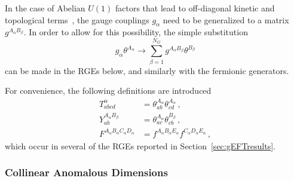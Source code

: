 In the case of Abelian $U(1)$ factors that lead to off-diagonal kinetic and topological terms~\cite{Holdom:1985ag,delAguila:1988jz}, the gauge couplings $g_{\alpha}$ need to be generalized to a matrix $g^{A_\alpha B_\beta}$. In order to allow for this possibility, the simple substitution
\begin{equation}
    g_\alpha \theta^{A_\alpha} \to \sum_{\beta=1}^{N_G} g^{A_\alpha B_\beta} \theta^{B_\beta}
\end{equation} 
can be made in the RGEs below,
and similarly with the fermionic generators.

For convenience, the following definitions are introduced
\begin{align}
    T^\alpha_{abcd} &= \theta^{A_\alpha}_{ab}\theta^{A_\alpha}_{cd}\,,\label{eq:T_def}\\
    Y^{A_\alpha B_\beta}_{ab} &= \theta^{A_\alpha}_{ac}\theta^{B_\beta}_{cb}\,,\label{eq:Y_def}\\
    F^{A_\alpha B_\alpha C_\alpha D_\alpha} &= f^{A_\alpha B_\alpha E_\alpha} f^{C_\alpha D_\alpha E_\alpha}\,,\label{eq:TYF_defs}
\end{align}
which occur in several of the RGEs reported in Section~\ref{sec:gEFTresults}.

\subsubsection{Collinear Anomalous Dimensions}

